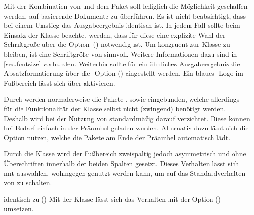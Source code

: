 \begin{DeclareEntity}{}
Mit der Kombination von  und dem Paket 
soll lediglich die Möglichkeit geschaffen werden, auf  
basierende Dokumente zu überführen. Es ist nicht beabsichtigt, dass bei einem 
Umstieg das Ausgabeergebnis identisch ist. In jedem Fall sollte beim Einsatz 
der Klasse  beachtet werden, dass für diese eine explizite 
Wahl der Schriftgröße über die Option~() 
notwendig ist. Um kongruent zur Klasse  zu bleiben, ist 
eine Schriftgröße von  sinnvoll. Weitere Informationen dazu 
sind in \autoref{sec:fontsize} vorhanden. Weiterhin sollte für ein ähnliches 
Ausgabeergebnis die Absatzformatierung über die \KOMAScript-Option 
() eingestellt werden. Ein blaues 
\DDC-Logo im Fußbereich lässt sich über  aktivieren.

\begin{Declaration}
  {}
\printdeclarationlist
%
Durch  werden normalerweise die Pakete , 
 sowie  eingebunden, welche allerdings für 
die Funktionalität der Klasse selbst nicht (zwingend) benötigt werden. Deshalb 
wird bei der Nutzung von  standardmäßig darauf verzichtet. 
Diese können bei Bedarf einfach in der Präambel geladen werden. Alternativ 
dazu 
lässt sich die Option  nutzen, welche die Pakete am Ende 
der Präambel automatisch lädt.
\end{Declaration}

\begin{Declaration}
  {}%
\printdeclarationlist
%
Durch die Klasse  wird der Fußbereich zweispaltig jedoch 
asymmetrisch und ohne Überschriften innerhalb der beiden Spalten gesetzt. 
Dieses Verhalten lässt sich mit  auswählen, wohingegen 
 genutzt werden kann, um auf das Standardverhalten 
von  zu schalten.
\end{Declaration}

\begin{Declaration}
  {}
  {identisch zu ()}
\printdeclarationlist
%
Mit der Klasse  lässt sich das Verhalten mit der Option 
() umsetzen.
\end{Declaration}


\end{DeclareEntity}
